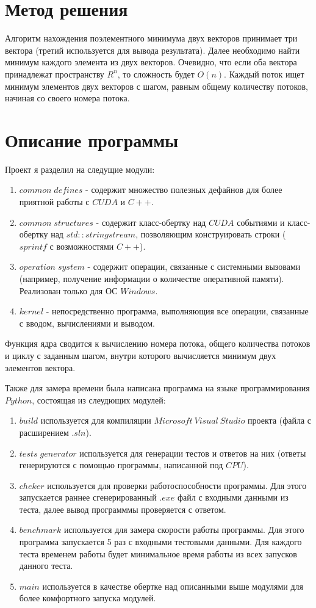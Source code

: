 \section{Метод решения}
Алгоритм нахождения поэлементного минимума двух векторов принимает три вектора (третий используется для вывода результата). 
Далее необходимо найти минимум каждого элемента из двух векторов. Очевидно, что если оба вектора принадлежат пространству $R^n$, то сложность будет $O(n)$.
Каждый поток ищет минимум элементов двух векторов с шагом, равным общему количеству потоков, начиная со своего номера потока.
\section{Описание программы}
Проект я разделил на следущие модули:
\begin{enumerate}
    \item $common \; defines$ - содержит множество полезных дефайнов для более приятной работы с $CUDA$ и $C++$.
    \item $common \; structures$ - содержит класс-обертку над $CUDA$ событиями и класс-обертку над $std\!::\!stringstream$, позволяющим конструировать строки ($sprintf$ с возможностями $C++$).
    \item $operation \; system$ - содержит операции, связанные с системными вызовами (например, получение информации о количестве оперативной памяти). Реализован только для ОС $Windows$.
    \item $kernel$ - непосредственно программа, выполняющия все операции, связанные с вводом, вычислениями и выводом.
\end{enumerate}

Функция ядра сводится к вычислению номера потока, общего количества потоков и циклу с заданным шагом, внутри которого вычисляется минимум двух элементов вектора.

Также для замера времени была написана программа на языке программирования $Python$, состоящая из слеудющих модулей:
\begin{enumerate}
    \item $build$ используется для компиляции $Microsoft\:Visual\:Studio$ проекта (файла с расширением $.sln$).
    \item $tests \; generator$ используется для генерации тестов и ответов на них (ответы генерируются с помощью программы, написанной под $CPU$).
    \item $cheker$ используется для проверки работоспособности программы.
     Для этого запускается раннее сгенерированный $.exe$ файл с входными данными из теста, далее вывод программмы проверяется с ответом.
    \item $benchmark$ используется для замера скорости работы программы. Для этого программа запускается 5 раз с входными тестовыми данными.
     Для каждого теста временем работы будет минимальное время работы из всех запусков данного теста.
    \item $main$ используется в качестве обертке над описанными выше модулями для более комфортного запуска модулей.
\end{enumerate}